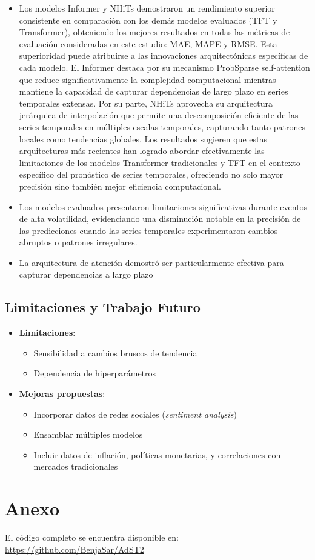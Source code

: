 \documentclass[12pt]{article}
\begin{document}
\begin{itemize}
\item Los modelos Informer y NHiTs demostraron un rendimiento superior consistente en comparación con los demás modelos evaluados (TFT y Transformer), obteniendo los mejores resultados en todas las métricas de evaluación consideradas en este estudio: MAE, MAPE y RMSE.
Esta superioridad puede atribuirse a las innovaciones arquitectónicas específicas de cada modelo. El Informer destaca por su mecanismo ProbSparse self-attention que reduce significativamente la complejidad computacional mientras mantiene la capacidad de capturar dependencias de largo plazo en series temporales extensas. Por su parte, NHiTs aprovecha su arquitectura jerárquica de interpolación que permite una descomposición eficiente de las series temporales en múltiples escalas temporales, capturando tanto patrones locales como tendencias globales.
Los resultados sugieren que estas arquitecturas más recientes han logrado abordar efectivamente las limitaciones de los modelos Transformer tradicionales y TFT en el contexto específico del pronóstico de series temporales, ofreciendo no solo mayor precisión sino también mejor eficiencia computacional.
\item Los modelos evaluados presentaron limitaciones significativas durante eventos de alta volatilidad, evidenciando una disminución notable en la precisión de las predicciones cuando las series temporales experimentaron cambios abruptos o patrones irregulares.
\item La arquitectura de atención demostró ser particularmente efectiva para capturar dependencias a largo plazo
\end{itemize}

\subsection{Limitaciones y Trabajo Futuro}

\begin{itemize}
\item \textbf{Limitaciones}:
\begin{itemize}
\item Sensibilidad a cambios bruscos de tendencia
\item Dependencia de hiperparámetros
\end{itemize}

\item \textbf{Mejoras propuestas}:
\begin{itemize}
\item Incorporar datos de redes sociales (\textit{sentiment analysis})
\item Ensamblar múltiples modelos
\item Incluir datos de inflación, políticas monetarias, y correlaciones con mercados tradicionales
\end{itemize}
\end{itemize}


\newpage
\section*{Anexo}
El código completo se encuentra disponible en: \\
\url{https://github.com/BenjaSar/AdST2}
\end{document}
